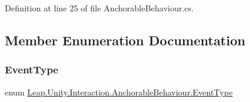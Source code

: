 Definition at line 25 of file Anchorable\+Behaviour.\+cs.



\subsection{Member Enumeration Documentation}
\mbox{\label{class_leap_1_1_unity_1_1_interaction_1_1_anchorable_behaviour_aaca223949e4a2b5124579fe4681e3d47}} 
\subsubsection{\texorpdfstring{EventType}{EventType}}
{\footnotesize\ttfamily enum \mbox{\hyperlink{class_leap_1_1_unity_1_1_interaction_1_1_anchorable_behaviour_aaca223949e4a2b5124579fe4681e3d47}{Leap.\+Unity.\+Interaction.\+Anchorable\+Behaviour.\+Event\+Type}}\hspace{0.3cm}{\ttfamily [strong]}}

